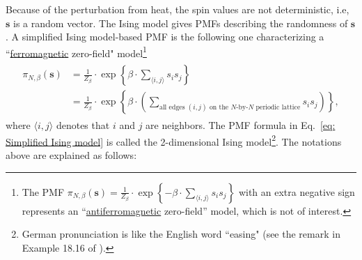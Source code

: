 \documentclass[11pt,letterpaper, leqno]{article}
\numberwithin{equation}{section}
\numberwithin{theorem}{section}
\numberwithin{lemma}{section}
\numberwithin{corollary}{section}
\numberwithin{definition}{section}
\numberwithin{proposition}{section}
\numberwithin{remark}{section}
\numberwithin{example}{section}
\begin{document}
Because of the perturbation from heat, the spin values are not deterministic, i.e, $\boldsymbol{s}$ is a random vector. The Ising model gives PMFs describing the randomness of $\boldsymbol{s}$. A simplified Ising model-based PMF is the following one characterizing a ``\href{https://en.wikipedia.org/wiki/Ferromagnetism}{ferromagnetic} zero-field" model\footnote{The PMF $\pi_{N,\beta}(\boldsymbol{s}) =\frac{1}{Z_\beta}\cdot\exp\left\{-\beta\cdot\sum_{\langle i,j\rangle}s_is_j\right\}$ with an extra negative sign represents an ``\href{https://en.wikipedia.org/wiki/Antiferromagnetism}{antiferromagnetic} zero-field'' model, which is not of interest. }
\begin{align}\label{eq: Simplified Ising model}
    \begin{aligned}
        \pi_{N,\beta}(\boldsymbol{s}) &=\frac{1}{Z_\beta}\cdot\exp\left\{\beta\cdot\sum_{\langle i,j\rangle}s_is_j\right\} \\
    &= \frac{1}{Z_\beta}\cdot\exp\left\{\beta\cdot \left( \sum_{\text{all edges }(i,j) \text{ on the $N$-by-$N$ periodic lattice}} s_is_j \right)\right\},
    \end{aligned}
\end{align}
where $\langle i,j \rangle$ denotes that $i$ and $j$ are neighbors. The PMF formula in Eq.~\eqref{eq: Simplified Ising model} is called the 2-dimensional Ising model\footnote{German pronunciation is like the English word ``easing" (see the remark in Example 18.16 of \cite{klenke2013probability}).}. The notations above are explained as follows:
\end{document}
